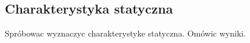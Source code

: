\subsection{Charakterystyka statyczna}
\label{lab:zad9}


%    

Spróbowac wyznaczyc charakterystyke statyczna. Omówic wyniki.

\newpage
